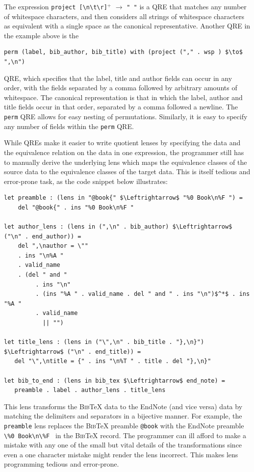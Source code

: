 \documentclass{svproc}
\newcommand{\cd}[1]{\lstinline[backgroundcolor=\color{white}]$#1$}
\newcommand{\bibtex}{\textsc{Bib}\TeX{}}
\begin{document}
The expression \cd{project [\n\t\r]}$^+$ $\to$ \cd{" "} is a QRE that matches any 
number of whitespace characters, and then considers all strings of whitespace
characters as equivalent with a single space as the canonical representative. 
Another QRE in the example above is the

\begin{center}
\begin{lstlisting}
perm (label, bib_author, bib_title) with (project ("," . wsp ) $\to$ ",\n")
\end{lstlisting}
\end{center}

\noindent QRE, which specifies that the label, title and author fields can occur
in any order, with the fields separated by a comma followed by arbitrary amounts
of whitespace. The canonical representation is that in which the label, author
and title fields occur in that order, separated by a comma followed a newline.
The \cd{perm} QRE allows for easy nesting of permutations. Similarly, it is easy
to specify any number of fields within the \cd{perm} QRE.

While QREs make it easier to write quotient lenses by specifying the data and
the equivalence relation on the data in one expression, the programmer still
has to manually derive the underlying lens which maps the equivalence classes
of the source data to the equivalence classes of the target data. This is
itself tedious and error-prone task, as the code snippet below illustrates:

\begin{lstlisting}
let preamble : (lens in "@book{" $\Leftrightarrow$ "%0 Book\n%F ") = 
    del "@book{" . ins "%0 Book\n%F "
  
let author_lens : (lens in (",\n" . bib_author) $\Leftrightarrow$ ("\n" . end_author)) = 
    del ",\nauthor = \""
    . ins "\n%A "
    . valid_name
    . (del " and "
         . ins "\n"
         . (ins "%A " . valid_name . del " and " . ins "\n")$^*$ . ins "%A "
         . valid_name
           || "")
           
let title_lens : (lens in ("\",\n" . bib_title . "},\n}") $\Leftrightarrow$ ("\n" . end_title)) =
   del "\",\ntitle = {" . ins "\n%T " . title . del "},\n}" 
    
let bib_to_end : (lens in bib_tex $\Leftrightarrow$ end_note) =
   preamble . label . author_lens . title_lens
\end{lstlisting}

This lens transforms the \bibtex{} data to the EndNote (and vice versa) data by
matching the delimiters and separators in a bijective manner. For example,
the \cd{preamble} lens replaces the \bibtex{} preamble \cd{@book} with the
EndNote preamble \cd{\%0 Book\n\%F } in the \bibtex{} record. The programmer
can ill afford to make a mistake with any one of the small but vital details
of the transformations since even a one character mistake might render the lens
incorrect. This makes lens programming tedious and error-prone.
\end{document}
